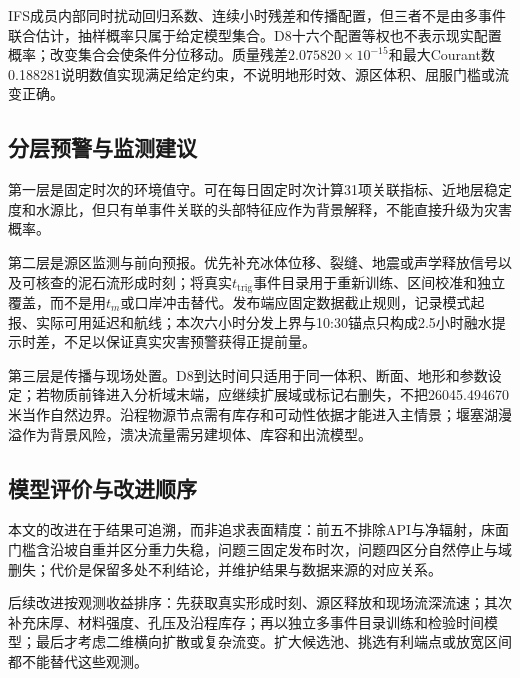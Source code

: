 IFS成员内部同时扰动回归系数、连续小时残差和传播配置，但三者不是由多事件联合估计，抽样概率只属于给定模型集合\cite{beven1992}。D8十六个配置等权也不表示现实配置概率；改变集合会使条件分位移动。质量残差$2.075820\times10^{-15}$和最大Courant数0.188281说明数值实现满足给定约束，不说明地形时效、源区体积、屈服门槛或流变正确。

\subsection{分层预警与监测建议}
第一层是固定时次的环境值守。可在每日固定时次计算31项关联指标、近地层稳定度和水源比，但只有单事件关联的头部特征应作为背景解释，不能直接升级为灾害概率。

第二层是源区监测与前向预报。优先补充冰体位移、裂缝、地震或声学释放信号以及可核查的泥石流形成时刻；将真实$t_{\mathrm{trig}}$事件目录用于重新训练、区间校准和独立覆盖，而不是用$t_m$或口岸冲击替代。发布端应固定数据截止规则，记录模式起报、实际可用延迟和航线；本次六小时分发上界与10:30锚点只构成2.5小时融水提示时差，不足以保证真实灾害预警获得正提前量。

第三层是传播与现场处置。D8到达时间只适用于同一体积、断面、地形和参数设定；若物质前锋进入分析域末端，应继续扩展域或标记右删失，不把26045.494670米当作自然边界。沿程物源节点需有库存和可动性依据才能进入主情景；堰塞湖漫溢作为背景风险，溃决流量需另建坝体、库容和出流模型。

\subsection{模型评价与改进顺序}
本文的改进在于结果可追溯，而非追求表面精度：前五不排除API与净辐射，床面门槛含沿坡自重并区分重力失稳，问题三固定发布时次，问题四区分自然停止与域删失；代价是保留多处不利结论，并维护结果与数据来源的对应关系。

后续改进按观测收益排序：先获取真实形成时刻、源区释放和现场流深流速；其次补充床厚、材料强度、孔压及沿程库存；再以独立多事件目录训练和检验时间模型；最后才考虑二维横向扩散或复杂流变。扩大候选池、挑选有利端点或放宽区间都不能替代这些观测。

